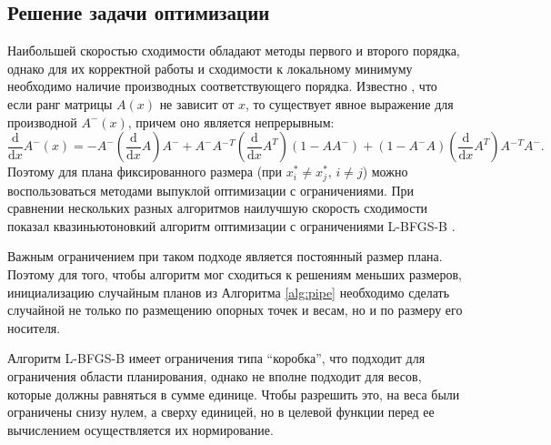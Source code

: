 \documentclass[specialist,
               substylefile = spbu.rtx,
               subf,href,colorlinks=true, 12pt]{disser}
\theoremstyle{definition}
\begin{document}
	\subsection{Решение задачи оптимизации}
	Наибольшей скоростью сходимости обладают методы первого и второго порядка, однако для их корректной работы и сходимости к локальному минимуму необходимо наличие производных соответствующего порядка. 
	Известно \cite{pinv_der}, что если ранг матрицы $A(x)$ не зависит от $x$, то существует явное выражение для производной $A^-(x)$, причем оно является непрерывным:
	\begin{equation*}
		\frac{\mathrm d}{\mathrm d x} A^-(x) =
 -A^- \left( \frac{\mathrm d}{\mathrm d x} A \right) A^-
+A^- A{^-}^T  \left( \frac{\mathrm d}{\mathrm d x} A^T \right) (1-A A^-)
+ (1-A^- A) \left( \frac{\mathrm d}{\mathrm d x} A^T \right) A{^-}^T A^-.
	\end{equation*}
	Поэтому для плана фиксированного размера (при $x_i^* \neq x_j^*, \, i \neq j$) можно воспользоваться методами выпуклой оптимизации с ограничениями. При сравнении нескольких разных алгоритмов наилучшую скорость сходимости показал квазиньютоновкий алгоритм оптимизации с ограничениями L-BFGS-B \cite{lbfgsb}.
	
	Важным ограничением при таком подходе является постоянный размер плана. Поэтому для того, чтобы алгоритм мог сходиться к решениям меньших размеров, инициализацию случайным планов из Алгоритма \ref{alg:pipe} необходимо сделать случайной не только по размещению опорных точек и весам, но и по размеру его носителя.    
	
	Алгоритм L-BFGS-B имеет ограничения типа  ``коробка'', что подходит для ограничения области планирования, однако не вполне подходит для весов, которые должны равняться в сумме единице. Чтобы разрешить это, на веса были ограничены снизу нулем, а сверху единицей, но в целевой функции перед ее вычислением осуществляется их нормирование.
\end{document}
